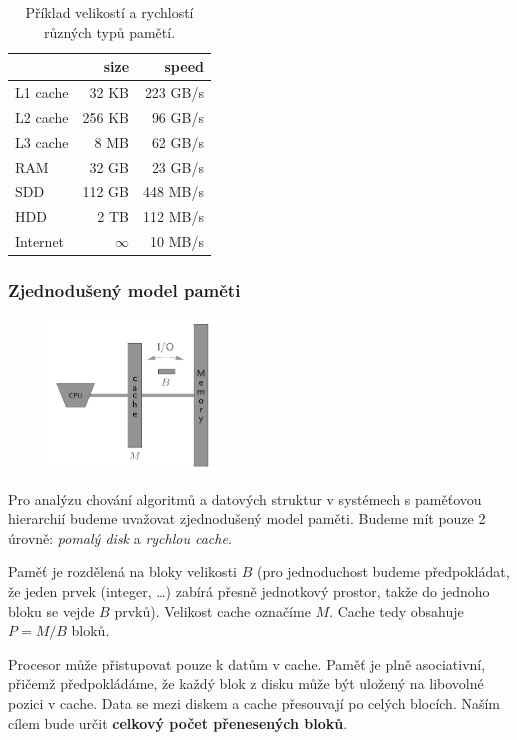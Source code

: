 \documentclass[11pt]{report} %
\numberwithin{equation}{section}
\begin{document}
\begin{table}[H]
	\centering
	\begin{tabular}{|l|r|r|}
		\hline
		& size & speed \\ \hline
		L1 cache & 32 KB & 223 GB/s \\ \hline
		L2 cache & 256 KB & 96 GB/s \\ \hline
		L3 cache & 8 MB & 62 GB/s \\ \hline		
		RAM 	& 32 GB & 23 GB/s \\ \hline		
		SDD 	& 112 GB & 448 MB/s \\ \hline		
		HDD 	& 2 TB & 112 MB/s \\ \hline		
		Internet & $\infty$ & 10 MB/s \\ \hline		
	\end{tabular}
	\caption{Příklad velikostí a rychlostí různých typů pamětí.}
\end{table}

\subsubsection{Zjednodušený model paměti}
\begin{figure}
	\includegraphics[width=0.4\textwidth]{img/memory_simple.png}
\end{figure}
Pro analýzu chování algoritmů a datových struktur v systémech s paměťovou hierarchií budeme uvažovat zjednodušený model paměti. Budeme mít pouze 2 úrovně: \textit{pomalý disk} a \textit{rychlou cache}.

Paměť je rozdělená na bloky velikosti $B$ (pro jednoduchost budeme předpokládat, že jeden prvek (integer, \dots) zabírá přesně jednotkový prostor, takže do jednoho bloku se vejde $B$ prvků). Velikost cache označíme $M$. Cache tedy obsahuje $P = M/B$ bloků. 

Procesor může přistupovat pouze k datům v cache. Paměť je plně asociativní, přičemž předpokládáme, že každý blok z disku může být uložený na libovolné pozici v cache. Data se mezi diskem a cache přesouvají po celých blocích. Naším cílem bude určit \textbf{celkový počet přenesených bloků}.
\end{document}

